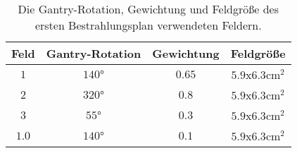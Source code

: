 \begin{table}
	\centering
	\caption{Die Gantry-Rotation, Gewichtung und Feldgröße des ersten Bestrahlungsplan verwendeten Feldern.}
	\label{tab:Felder2}
	\begin{tabular}{c c c c}
		\toprule
		Feld & Gantry-Rotation & Gewichtung & Feldgröße\\
		\midrule
		$1$ & $140°$   & $0.65$ & $\num{5.9}$x$\num{6.3} \si{\centi\meter\squared}$ \\
		$2$ & $320°$  & $0.8$ & $\num{5.9}$x$\num{6.3} \si{\centi\meter\squared}$ \\
		$3$ & $55°$ & $0.3$ & $\num{5.9}$x$\num{6.3} \si{\centi\meter\squared}$ \\
		$1.0$ & $140°$ & $0.1$ & $\num{5.9}$x$\num{6.3} \si{\centi\meter\squared}$ \\
		\bottomrule
	\end{tabular}
\end{table}

